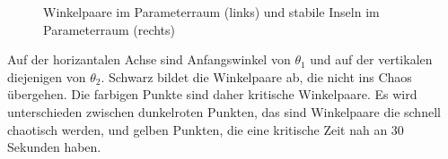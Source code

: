 \begin{figure}
\begin{minipage}{0.45\textwidth}
    \end{minipage}
    \caption{Winkelpaare im Parameterraum (links) und stabile Inseln im Parameterraum (rechts)}
    \label{fig:Parameterraum}
\end{figure}
Auf der horizantalen Achse sind Anfangswinkel von \(\theta_1\) und
auf der vertikalen diejenigen von \(\theta_2\).
Schwarz bildet die Winkelpaare ab, die nicht ins Chaos übergehen.
Die farbigen Punkte sind daher kritische Winkelpaare.
Es wird unterschieden zwischen dunkelroten Punkten,
das sind Winkelpaare die schnell chaotisch werden, und
gelben Punkten, die eine kritische Zeit nah an 30 Sekunden haben. %